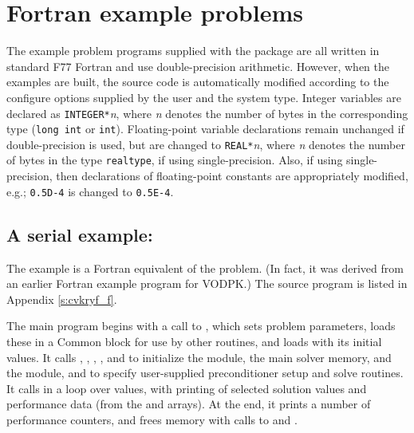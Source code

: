 \section{Fortran example problems}\label{s:ex_fortran}

The {\F} example problem programs supplied with the {\cvode}
package are all written in standard F77 Fortran and use double-precision
arithmetic. However, when the {\F} examples are built, the source code is
automatically modified according to the configure options supplied by the
user and the system type. Integer variables are declared as {\tt INTEGER*}{\em n},
where {\em n} denotes the number of bytes in the corresponding {\C} type
({\tt long int} or {\tt int}). Floating-point variable declarations remain
unchanged if double-precision is used, but are changed to {\tt REAL*}{\em n},
where {\em n} denotes the number of bytes in the {\sundials} type {\tt realtype},
if using single-precision. Also, if using single-precision, then declarations of
floating-point constants are appropriately modified, e.g.; {\tt 0.5D-4} is
changed to {\tt 0.5E-4}.


\subsection{A serial example: }\label{ss:cvkryf}

The  example is a Fortran equivalent of the  problem.
(In fact, it was derived from an earlier Fortran example program for VODPK.)
The source program  is listed in Appendix \ref{s:cvkryf_f}.

The main program begins with a call to , which sets problem
parameters, loads these in a Common block for use by other routines, and
loads  with its initial values.  It calls , ,
, , and  to initialize
the {\nvecs} module, the main solver memory, and the {\cvspgmr} module, and
to specify user-supplied preconditioner setup and solve routines.
It calls  in a loop over  values, with printing of
selected solution values and performance data (from the   and 
arrays).  At the end, it prints a number of performance counters, and
frees memory with calls to  and .

